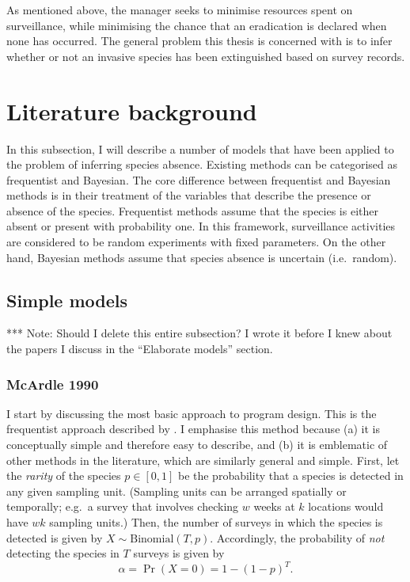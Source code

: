 \documentclass[
]{book}
\begin{document}
As mentioned above, the manager seeks to minimise resources spent on surveillance, while minimising the chance that an eradication is declared when none has occurred. The general problem this thesis is concerned with is to infer whether or not an invasive species has been extinguished based on survey records.

\hypertarget{literature-background}{%
\section{Literature background}\label{literature-background}}

In this subsection, I will describe a number of models that have been applied to the problem of inferring species absence. Existing methods can be categorised as frequentist and Bayesian. The core difference between frequentist and Bayesian methods is in their treatment of the variables that describe the presence or absence of the species. Frequentist methods assume that the species is either absent or present with probability one. In this framework, surveillance activities are considered to be random experiments with fixed parameters. On the other hand, Bayesian methods assume that species absence is uncertain (i.e.~random).

\hypertarget{simple-models}{%
\subsection{Simple models}\label{simple-models}}

*** Note: Should I delete this entire subsection? I wrote it before I knew about the papers I discuss in the ``Elaborate models'' section.

\hypertarget{mcardle-1990}{%
\subsubsection{McArdle 1990}\label{mcardle-1990}}

I start by discussing the most basic approach to program design. This is the frequentist approach described by \citet{mcardle1990}. I emphasise this method because (a) it is conceptually simple and therefore easy to describe, and (b) it is emblematic of other methods in the literature, which are similarly general and simple. First, let the \emph{rarity} of the species \(p \in [0, 1]\) be the probability that a species is detected in any given sampling unit. (Sampling units can be arranged spatially or temporally; e.g.~a survey that involves checking \(w\) weeks at \(k\) locations would have \(wk\) sampling units.) Then, the number of surveys in which the species is detected is given by \(X \sim \mathrm{Binomial}(T, p)\). Accordingly, the probability of \emph{not} detecting the species in \(T\) surveys is given by
\[
\alpha = \Pr(X = 0) = 1 - (1 - p)^T.
\]
\end{document}
